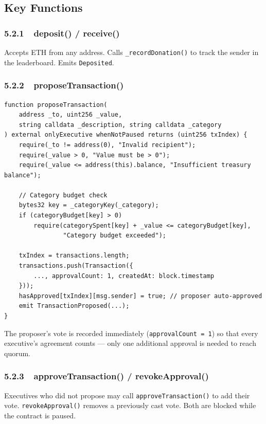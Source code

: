 \documentclass[12pt,a4paper]{article}
\begin{document}
\subsection{Key Functions}
\label{sec:key-functions}

\subsubsection*{5.2.1\ \ deposit() / receive()}

Accepts ETH from any address. Calls \texttt{\_recordDonation()} to track the sender in the leaderboard. Emits \texttt{Deposited}.

\subsubsection*{5.2.2\ \ proposeTransaction()}

\begin{lstlisting}[caption={proposeTransaction — core multi-sig entry point}]
function proposeTransaction(
    address _to, uint256 _value,
    string calldata _description, string calldata _category
) external onlyExecutive whenNotPaused returns (uint256 txIndex) {
    require(_to != address(0), "Invalid recipient");
    require(_value > 0, "Value must be > 0");
    require(_value <= address(this).balance, "Insufficient treasury balance");

    // Category budget check
    bytes32 key = _categoryKey(_category);
    if (categoryBudget[key] > 0)
        require(categorySpent[key] + _value <= categoryBudget[key],
                "Category budget exceeded");

    txIndex = transactions.length;
    transactions.push(Transaction({
        ..., approvalCount: 1, createdAt: block.timestamp
    }));
    hasApproved[txIndex][msg.sender] = true; // proposer auto-approved
    emit TransactionProposed(...);
}
\end{lstlisting}

The proposer's vote is recorded immediately (\texttt{approvalCount = 1}) so that every executive's agreement counts — only one additional approval is needed to reach quorum.

\subsubsection*{5.2.3\ \ approveTransaction() / revokeApproval()}

Executives who did not propose may call \texttt{approveTransaction()} to add their vote. \texttt{revokeApproval()} removes a previously cast vote. Both are blocked while the contract is paused.
\end{document}
